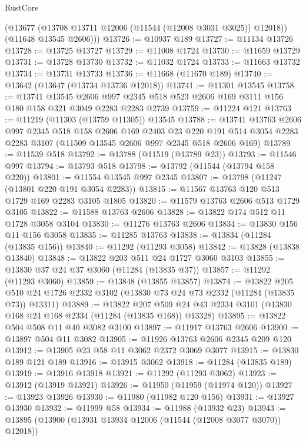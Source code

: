 \begin{lexlean}{RustCore}
\begin{coremodule}
        (@13677 (@13708 @13711 @12006 (@11544 (@12008 @3031 @3025)) @12018))
        (@11648 @13545 @2606)))
@13726 := @10937 @189
@13727 := @11134 @13726
@13728 := @13725 @13727
@13729 := @11008 @1724
@13730 := @11659 @13729
@13731 := @13728 @13730
@13732 := @11032 @1724
@13733 := @11663 @13732
@13734 := @13731 @13733
@13736 := @11668 (@11670 @189)
@13740 := @13642 (@13647 (@13734 @13736 @12018))
@13741 := @11301 @13545
@13758 := @13741
    @13545
    @2606
    @997
    @2345
    @518
    @523
    @2606
    @169
    @3111
    @156
    @180
    @158
    @321
    @3049
    @2283
    @2283
    @2739
@13759 := @11224 @121
@13763 := @11219 (@11303 (@13759 @11305)) @13545
@13788 := @13741
    @13763
    @2606
    @997
    @2345
    @518
    @158
    @2606
    @169
    @2403
    @23
    @220
    @191
    @514
    @3054
    @2283
    @2283
    @3107
    (@11509 @13545 @2606 @997 @2345 @518 @2606 @169)
@13789 := @11539 @518
@13792 := @13788 (@11519 (@13789 @23))
@13793 := @11546 @997
@13794 := @13793 @518
@13798 := @13792 (@11544 (@13794 @158 @220))
@13801 := @11554 @13545 @997 @2345
@13807 := @13798 (@11247 (@13801 @220 @191 @3054 @2283))
@13815 := @11567 @13763 @120 @513 @1729 @169 @2283 @3105 @1805
@13820 := @11579 @13763 @2606 @513 @1729 @3105
@13822 := @11588 @13763 @2606
@13828 := @13822 @174 @512 @11 @1728 @3058 @3104
@13830 := @11276 @13763 @2606
@13834 := @13830 @156 @11 @156 @3058
@13835 := @11285 @13763
@13838 := @13834 (@11284 (@13835 @156))
@13840 := @11292 (@11293 @3058)
@13842 := @13828 (@13838 @13840)
@13848 := @13822 @203 @511 @24 @1727 @3060 @3103
@13855 := @13830 @37 @24 @37 @3060 (@11284 (@13835 @37))
@13857 := @11292 (@11293 @3060)
@13859 := @13848 (@13855 @13857)
@13874 := @13822
    @205
    @510
    @24
    @1726
    @2332
    @3102
    (@13830 @73 @24 @73 @2332 (@11284 (@13835 @73)) @13311)
@13889 := @13822
    @207
    @509
    @24
    @43
    @2334
    @3101
    (@13830 @168 @24 @168 @2334 (@11284 (@13835 @168)) @13328)
@13895 := @13822 @504 @508 @11 @40 @3082 @3100
@13897 := @11917 @13763 @2606
@13900 := @13897 @504 @11 @3082
@13905 := @11926 @13763 @2606 @2345 @209 @120
@13912 := @13905 @23 @58 @11 @3062 @2372 @3069 @3077
@13915 := @13830 @189 @121 @189
@13916 := @13915 @3062
@13918 := @11284 (@13835 @189)
@13919 := @13916 @13918
@13921 := @11292 (@11293 @3062)
@13923 := @13912 (@13919 @13921)
@13926 := @11950 (@11959 (@11974 @120))
@13927 := @13923 @13926
@13930 := @11980 (@11982 @120 @156)
@13931 := @13927 @13930
@13932 := @11999 @58
@13934 := @11988 (@13932 @23)
@13943 := @13895 (@13900 (@13931 @13934 @12006 (@11544 (@12008 @3077 @3070)) @12018))

\end{coremodule}
\end{lexlean}
